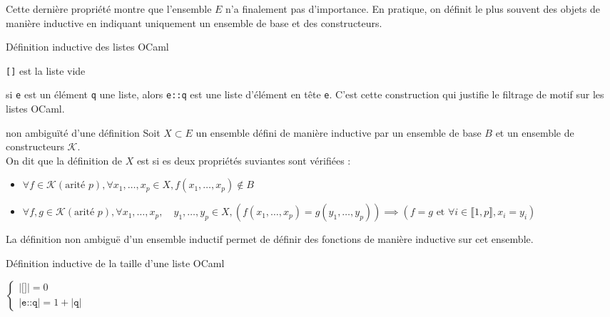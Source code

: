         \begin{remarque}{6.43}{}
            \item Cette dernière propriété montre que l'ensemble $E$ n'a finalement pas d'importance. En pratique, on définit le plus souvent des objets de manière inductive en indiquant uniquement un ensemble de base et des constructeurs.
        \end{remarque}

        
        \begin{exemple}{6.44}{Définition inductive des listes OCaml}
            \item \texttt{[]} est la liste vide
            \item si \texttt{e} est un élément \texttt{q} une liste, alors \texttt{e::q} est une liste d'élément en tête \texttt{e}. C'est cette construction qui justifie le filtrage de motif sur les listes OCaml.
        \end{exemple}


        \begin{definition}{6.45}{non ambiguïté d'une définition}
            Soit $X \subset E$ un ensemble défini de manière inductive par un ensemble de base $B$ et un ensemble de constructeurs $\mathcal{K}$.\\ On dit que la définition de $X$ est  si es deux propriétés suviantes sont vérifiées : \begin{itemize}
                \item $\forall f \in \mathcal{K} (\text{arité }p), \forall x_1,\ldots, x_p \in X, f(x_1,\ldots, x_p) \notin B$
                \item $\forall f,g \in \mathcal{K} (\text{arité }p), \forall x_1,\ldots, x_p, \quad y_1, \ldots,y_p \in X, (f(x_1,\ldots, x_p) = g(y_1,\ldots,y_p)) \implies (f = g \text{ et } \forall i \in \llbracket 1,p \rrbracket, x_i = y_i)$
            \end{itemize}
            La définition non ambiguë d'un ensemble inductif permet de définir des fonctions de manière inductive sur cet ensemble.
        \end{definition}

        \begin{exemple}{6.46}{Définition inductive de la taille d'une liste OCaml}
            \item $\begin{cases}
                |\texttt{[]}| = 0 \\
                |\texttt{e::q}| = 1 + |\texttt{q}|

            \end{cases}$
            
        \end{exemple}


